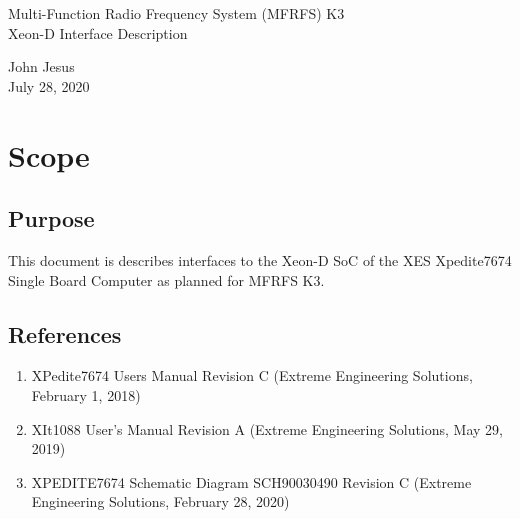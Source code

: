 \documentclass[12pt]{article}
\begin{document}
\thispagestyle{empty}
\begin{titlepage}
\begin{center}
        \vspace*{1cm}

        \LARGE{Multi-Function Radio Frequency System (MFRFS) K3 \\
            Xeon-D Interface Description}

        \vspace{0.5cm}
        \LARGE

        \vspace{1.5cm}

        \normalsize

        John Jesus \\
        July 28, 2020

        \vfill



        \vspace{0.8cm}




\end{center}
\end{titlepage}

\tableofcontents
\newpage

\section{Scope}
\subsection{Purpose}
This document is describes interfaces to the Xeon-D SoC of the XES Xpedite7674 Single Board Computer as planned for MFRFS K3.

\subsection{References}
\begin{enumerate}
    \item XPedite7674 Users Manual Revision C (Extreme Engineering Solutions, February 1, 2018) \label{ref:board_man}
    \item XIt1088 User’s Manual Revision A (Extreme Engineering Solutions, May 29, 2019) \label{ref:rtm_man}
    \item XPEDITE7674 Schematic Diagram SCH90030490 Revision C (Extreme Engineering Solutions, February 28, 2020) \label{ref:schematic}
\end{enumerate}
\end{document}
